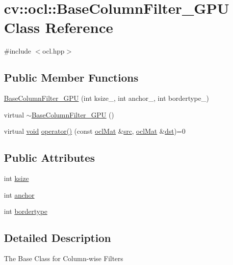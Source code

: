 \hypertarget{classcv_1_1ocl_1_1BaseColumnFilter__GPU}{\section{cv\-:\-:ocl\-:\-:Base\-Column\-Filter\-\_\-\-G\-P\-U Class Reference}
\label{classcv_1_1ocl_1_1BaseColumnFilter__GPU}
}


{\ttfamily \#include $<$ocl.\-hpp$>$}

\subsection*{Public Member Functions}
\begin{DoxyCompactItemize}
\item 
\hyperlink{classcv_1_1ocl_1_1BaseColumnFilter__GPU_aafe9d83f07f97ddee48f55a4359df687}{Base\-Column\-Filter\-\_\-\-G\-P\-U} (int ksize\-\_\-, int anchor\-\_\-, int bordertype\-\_\-)
\item 
virtual \hyperlink{classcv_1_1ocl_1_1BaseColumnFilter__GPU_a71b7243c1665f5f7df3051b1e900897e}{$\sim$\-Base\-Column\-Filter\-\_\-\-G\-P\-U} ()
\item 
virtual \hyperlink{legacy_8hpp_a8bb47f092d473522721002c86c13b94e}{void} \hyperlink{classcv_1_1ocl_1_1BaseColumnFilter__GPU_a4cf91002918fb2b590f294b2b1af36ef}{operator()} (const \hyperlink{classcv_1_1ocl_1_1oclMat}{ocl\-Mat} \&\hyperlink{legacy_8hpp_a371cd109b74033bc4366f584edd3dacc}{src}, \hyperlink{classcv_1_1ocl_1_1oclMat}{ocl\-Mat} \&\hyperlink{photo__c_8h_aed13e2a25279b24dc954073233fef7a5}{dst})=0
\end{DoxyCompactItemize}
\subsection*{Public Attributes}
\begin{DoxyCompactItemize}
\item 
int \hyperlink{classcv_1_1ocl_1_1BaseColumnFilter__GPU_ac318a06ffc096ba9bc32d83912d6bf50}{ksize}
\item 
int \hyperlink{classcv_1_1ocl_1_1BaseColumnFilter__GPU_a8ff8cf954e28626afd0333ced6ddf174}{anchor}
\item 
int \hyperlink{classcv_1_1ocl_1_1BaseColumnFilter__GPU_ac1a0e9161e47cb7aea7be8de9a1ebcaf}{bordertype}
\end{DoxyCompactItemize}


\subsection{Detailed Description}
The Base Class for Column-\/wise Filters

